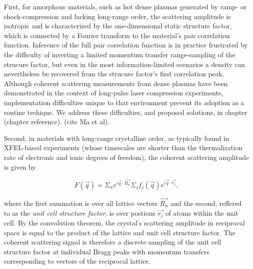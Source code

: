 \documentclass [11pt, proquest, article] {uwthesis}[2016/11/22]
\begin{document}
First, for amorphous materials, such as hot dense plasmas generated by ramp- or shock-compression and lacking long-range order, the scattering amplitude is isotropic and is characterized by the one-dimensional static structure factor, which is connected by a Fourier transform to the material's pair correlation function. Inference of the full pair correlation function is in practice frustrated by the difficulty of inverting a limited momentum transfer range-sampling of the strucure factor, but even in the most information-limited scenarios a density can nevertheless be recovered from the strucure factor's first correlation peak. Although coherent scattering measurements from dense plasmas have been demonstrated in the context of long-pulse laser compression experiments, implementation difficulties unique to that environment prevent its adoption as a routine techique. We address these difficulties, and proposed solutions, in chapter (chapter reference). (cite Ma et al).

Second, in materials with long-range crystalline order, as typically found in XFEL-based experiments (whose timescales are shorter than the thermalization rate of electronic and ionic degrees of freedom), the coherent scattering amplitude is given by

\begin{equation}
F(\vec{q}) = \Sigma_n e^{i \vec{q} \cdot \vec{R_n}} \Sigma_j f_j(\vec{q}) e^{i \vec{q} \cdot \vec{r_j}},
\end{equation}

where the first summation is over all lattice vectors $\vec{R_n}$ and the second, reffered to as the \emph{unit cell structure factor}, is over postions $\vec{r_j}$ of atoms within the unit cell. By the convolution theorem, the crystal's scattering amplitude in reciprocal space is equal to the product of the lattice and unit cell structure factor. The coherent scattering signal is therefore a discrete sampling of the unit cell structure factor at individual Bragg peaks with momentum transfers corresponding to vectors of the reciprocal lattice.
\end{document}

